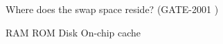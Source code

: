 \vspace{0.08in}


\begin{minipage}{\linewidth}

  \question  Where does the swap space reside? (GATE-2001 )

  \begin{oneparchoices}
    \choice RAM
    \choice ROM
    \choice Disk
    \choice On-chip cache
  \end{oneparchoices}

  \end{minipage}

\vspace{0.08in}


\begin{comment}

\begin{minipage}{\linewidth}

  \question  (GATE- )

  \begin{choices}
    \choice
    \choice
    \choice
    \choice
  \end{choices}

\end{minipage}

\vspace{0.08in}


\end{comment}
